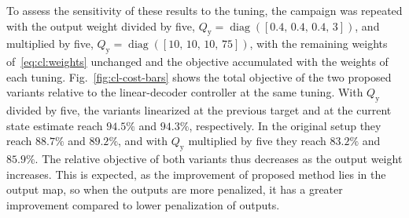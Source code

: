 \documentclass[preprint,12pt,authoryear]{elsarticle}
\theoremstyle{remark}
\DeclareMathOperator{\diag}{diag}
\newcommand{\ui}[2]{#1_{\text{#2}}}
\begin{document}
To assess the sensitivity of these results to the tuning, the campaign was repeated with the output weight divided by five, $\ui{Q}{y} = \diag([0.4,\, 0.4,\, 0.4,\, 3])$, and multiplied by five, $\ui{Q}{y} = \diag([10,\, 10,\, 10,\, 75])$, with the remaining weights of~\eqref{eq:cl:weights} unchanged and the objective accumulated with the weights of each tuning. Fig.~\ref{fig:cl-cost-bars} shows the total objective of the two proposed variants relative to the linear-decoder controller at the same tuning. With $\ui{Q}{y}$ divided by five, the variants linearized at the previous target and at the current state estimate reach $94.5\%$ and $94.3\%$, respectively. In the original setup they reach $88.7\%$ and $89.2\%$, and with $\ui{Q}{y}$ multiplied by five they reach $83.2\%$ and $85.9\%$. The relative objective of both variants thus decreases as the output weight increases. This is expected, as the improvement of proposed method lies in the output map, so when the outputs are more penalized, it has a greater improvement compared to lower penalization of outputs.
\end{document}
